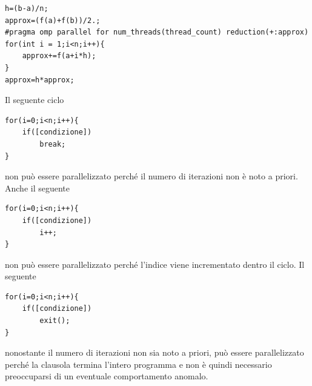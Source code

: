 \documentclass[10pt, letterpaper]{report}
\begin{document}
\begin{lstlisting}[style=CStyle]
h=(b-a)/n;
approx=(f(a)+f(b))/2.;
#pragma omp parallel for num_threads(thread_count) reduction(+:approx)
for(int i = 1;i<n;i++){
    approx+=f(a+i*h);
}
approx=h*approx;
\end{lstlisting}
Il seguente ciclo 
\begin{lstlisting}[style=CStyle]
for(i=0;i<n;i++){
    if([condizione])
        break;
}
\end{lstlisting}
non può essere parallelizzato perché il numero di iterazioni non è noto a priori. Anche il seguente
\begin{lstlisting}[style=CStyle]
for(i=0;i<n;i++){
    if([condizione])
        i++;
}
\end{lstlisting}
non può essere parallelizzato perché l'indice viene incrementato dentro il ciclo. Il seguente 
\begin{lstlisting}[style=CStyle]
for(i=0;i<n;i++){
    if([condizione])
        exit();
}
\end{lstlisting}
nonostante il numero di iterazioni non sia noto a priori, può essere parallelizzato perché la clausola  termina l'intero programma e non è quindi necessario preoccuparsi di un eventuale comportamento anomalo.
\end{document}

